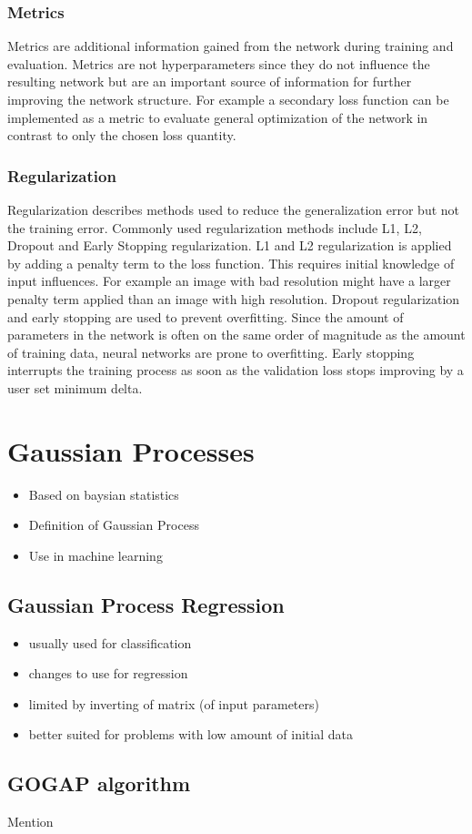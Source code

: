 			\subsubsection{Metrics}
				Metrics are additional information gained from the network during training and evaluation. Metrics are not hyperparameters since they do not influence the resulting network but are an important source of information for further improving the network structure. For example a secondary loss function can be implemented as a metric to evaluate general optimization of the network in contrast to only the chosen loss quantity. 
			\subsubsection{Regularization}
				Regularization describes methods used to reduce the generalization error but not the training error. Commonly used regularization methods include L1, L2, Dropout and Early Stopping regularization. L1 and L2 regularization is applied by adding a penalty term to the loss function. This requires initial knowledge of input influences. For example an image with bad resolution might have a larger penalty term applied than an image with high resolution. Dropout regularization and early stopping are used to prevent overfitting. Since the amount of parameters in the network is often on the same order of magnitude as the amount of training data, neural networks are prone to overfitting. Early stopping interrupts the training process as soon as the validation loss stops improving by a user set minimum delta. 
	\section{Gaussian Processes}
		\begin{itemize}
			\item Based on baysian statistics\\
			\item Definition of Gaussian Process\\
			\item Use in machine learning
		\end{itemize}
		\subsection{Gaussian Process Regression}
			\begin{itemize}
				\item usually used for classification\\
				\item changes to use for regression\\
				\item limited by inverting of matrix (of input parameters)\\
				\item better suited for problems with low amount of initial data
			\end{itemize}
		\subsection{GOGAP algorithm}
			Mention
